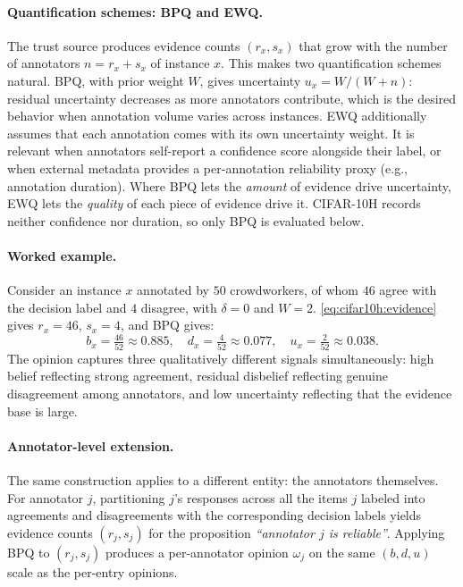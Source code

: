 \paragraph{Quantification schemes: \ac{BPQ} and \ac{EWQ}.}
The trust source produces evidence counts $(r_x, s_x)$ that grow with the number of annotators $n = r_x + s_x$ of instance $x$. This makes two quantification schemes natural. \ac{BPQ}, with prior weight $W$, gives uncertainty $u_x = W / (W + n)$: residual uncertainty decreases as more annotators contribute, which is the desired behavior when annotation volume varies across instances. \ac{EWQ} additionally assumes that each annotation comes with its own uncertainty weight. It is relevant when annotators self-report a confidence score alongside their label, or when external metadata provides a per-annotation reliability proxy (e.g., annotation duration). Where \ac{BPQ} lets the \emph{amount} of evidence drive uncertainty, \ac{EWQ} lets the \emph{quality} of each piece of evidence drive it. CIFAR-10H records neither confidence nor duration, so only \ac{BPQ} is evaluated below.

\paragraph{Worked example.}
Consider an instance $x$ annotated by $50$ crowdworkers, of whom $46$ agree with the decision label and $4$ disagree, with $\delta = 0$ and $W = 2$. \cref{eq:cifar10h:evidence} gives $r_x = 46$, $s_x = 4$, and \ac{BPQ} gives:
\begin{equation}
b_x = \tfrac{46}{52} \approx 0.885,\quad
d_x = \tfrac{4}{52} \approx 0.077,\quad
u_x = \tfrac{2}{52} \approx 0.038.
\end{equation}
The opinion captures three qualitatively different signals simultaneously: high belief reflecting strong agreement, residual disbelief reflecting genuine disagreement among annotators, and low uncertainty reflecting that the evidence base is large.

\paragraph{Annotator-level extension.}
The same construction applies to a different entity: the annotators themselves. For annotator $j$, partitioning $j$'s responses across all the items $j$ labeled into agreements and disagreements with the corresponding decision labels yields evidence counts $(r_j, s_j)$ for the proposition \emph{``annotator $j$ is reliable''}. Applying \ac{BPQ} to $(r_j, s_j)$ produces a per-annotator opinion $\omega_j$ on the same $(b, d, u)$ scale as the per-entry opinions.

